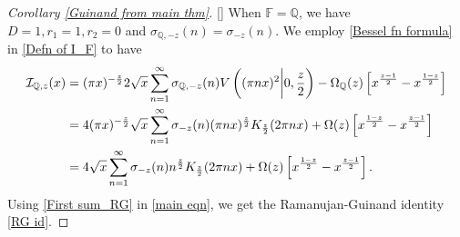 \documentclass[12pt,reqno]{amsart}
\renewcommand{\(}{\left\(}
\renewcommand{\)}{\right\)}
\renewcommand{\[}{\left\[}
\renewcommand{\]}{\right\]}
\numberwithin{equation}{section}
\theoremstyle{plain}
\begin{document}
\begin{proof}[Corollary \rm{\ref{Guinand from main thm}}][]
When $\mathbb{F} = \mathbb{Q}$, we have $D = 1, r_1 = 1, r_2 = 0$ and  $\sigma_{\mathbb{Q}, -z}(n) = \sigma_{-z}(n)$. We employ \eqref{Bessel fn formula} in \eqref{Defn of I_F} to have
\begin{align}
\mathcal{I}_{\mathbb{Q}, z}(x) &= (\pi x)^{-\frac{z}{2}}2\sqrt{x}\sum_{n=1}^{\infty}\sigma_{\mathbb{Q}, -z}(n)V\left((\pi n x)^2\bigg| 0, \frac{z}{2}\right) - \Omega_{\mathbb{Q}}(z)\left[x^{\frac{z-1}{2}} - x^{\frac{1-z}{2}}\right] \notag \\
&= 4(\pi x)^{-\frac{z}{2}}\sqrt{x}\sum_{n=1}^{\infty}\sigma_{-z}(n)(\pi n x)^{\frac{z}{2}}K_{\frac{z}{2}}(2\pi nx) + \Omega(z)\left[x^{\frac{1-z}{2}} - x^{\frac{z-1}{2}}\right]  \nonumber \\
&= 4\sqrt{x}\sum_{n=1}^{\infty}\sigma_{-z}(n)n^{\frac{z}{2}}K_{\frac{z}{2}}(2\pi nx) + \Omega(z)\left[x^{\frac{1-z}{2}} - x^{\frac{z-1}{2}}\right].\label{First sum_RG}
\end{align}
Using \eqref{First sum_RG} in \eqref{main eqn}, we get the Ramanujan-Guinand identity \eqref{RG id}.
\end{proof}
\end{document}
